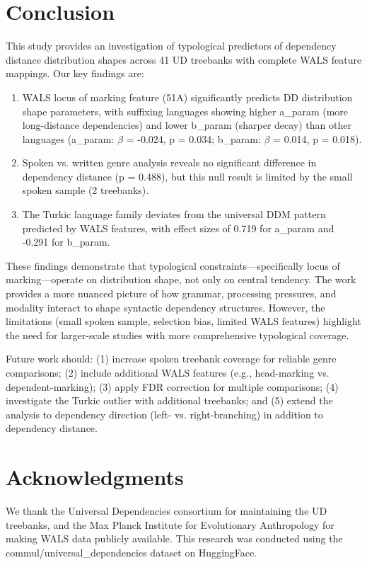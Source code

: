 \documentclass[11pt,letterpaper]{article}
\begin{document}
\section{Conclusion}

This study provides an investigation of typological predictors of dependency distance distribution shapes across 41 UD treebanks with complete WALS feature mappings. Our key findings are:

\begin{enumerate}
  \item WALS locus of marking feature (51A) significantly predicts DD distribution shape parameters, with suffixing languages showing higher a\_param (more long-distance dependencies) and lower b\_param (sharper decay) than other languages (a\_param: $\beta$ = -0.024, p = 0.034; b\_param: $\beta$ = 0.014, p = 0.018).

  \item Spoken vs. written genre analysis reveals no significant difference in dependency distance (p = 0.488), but this null result is limited by the small spoken sample (2 treebanks).

  \item The Turkic language family deviates from the universal DDM pattern predicted by WALS features, with effect sizes of 0.719 for a\_param and -0.291 for b\_param.
\end{enumerate}

These findings demonstrate that typological constraints---specifically locus of marking---operate on distribution shape, not only on central tendency. The work provides a more nuanced picture of how grammar, processing pressures, and modality interact to shape syntactic dependency structures. However, the limitations (small spoken sample, selection bias, limited WALS features) highlight the need for larger-scale studies with more comprehensive typological coverage.

Future work should: (1) increase spoken treebank coverage for reliable genre comparisons; (2) include additional WALS features (e.g., head-marking vs. dependent-marking); (3) apply FDR correction for multiple comparisons; (4) investigate the Turkic outlier with additional treebanks; and (5) extend the analysis to dependency direction (left- vs. right-branching) in addition to dependency distance.

\section*{Acknowledgments}

We thank the Universal Dependencies consortium for maintaining the UD treebanks, and the Max Planck Institute for Evolutionary Anthropology for making WALS data publicly available. This research was conducted using the commul/universal\_dependencies dataset on HuggingFace.



\end{document}

